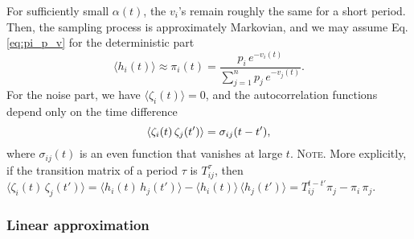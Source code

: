 \documentclass[reprint, floatfix]{revtex4-1}
\newcommand{\note}[1]{{\color{DarkGreen}\footnotesize \textsc{Note.} #1}}
\begin{document}
For sufficiently small $\alpha(t)$,
the $v_i$'s remain roughly the same for a short period.
%
Then,
the sampling process is approximately Markovian, %
and we may assume Eq. \eqref{eq:pi_p_v}
for the deterministic part
%
\begin{equation}
  \langle h_i(t) \rangle
  \approx
  \pi_i(t)
  =
  \frac{                p_i \, e^{-v_i(t)} }
       { \sum_{j = 1}^n p_j \, e^{-v_j(t)} }.
  \label{eq:h_ave}
\end{equation}
%
%
%
For the noise part, we have
$\langle \zeta_i(t) \rangle = 0$,
%
and the autocorrelation functions
depend only on the time difference
%
\begin{equation}
  \langle \zeta_i(t) \, \zeta_j(t') \rangle
  =
  \sigma_{ij}(t - t'),
  \notag
\end{equation}
%
where $\sigma_{ij}(t)$ is an even function
that vanishes at large $t$.
%
\note{More explicitly,
if the transition matrix of a period $\tau$
is $T^\tau_{ij}$,
then
$
  \langle \zeta_i(t) \, \zeta_j(t') \rangle
  =
  \langle h_i(t) \, h_j(t') \rangle
  -
  \langle h_i(t) \rangle \, \langle h_j(t') \rangle
  =
  T^{t - t'}_{ij} \pi_j - \pi_i \, \pi_j.
$
}%



\subsubsection{Linear approximation}
\end{document}
